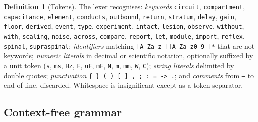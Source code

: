 \documentclass[11pt,twocolumn,a4paper]{article}
\theoremstyle{thmstyle}
\theoremstyle{definition}
\newtheorem{definition}[theorem]{Definition}
\theoremstyle{remark}
\begin{document}
\begin{definition}[Tokens]
\label{def:tokens}
The lexer recognises:
\emph{keywords}
\texttt{circuit}, \texttt{compartment}, \texttt{capacitance},
\texttt{element}, \texttt{conducts}, \texttt{outbound}, \texttt{return},
\texttt{stratum}, \texttt{delay}, \texttt{gain}, \texttt{floor},
\texttt{derived}, \texttt{event}, \texttt{type},
\texttt{experiment}, \texttt{intact}, \texttt{lesion}, \texttt{observe},
\texttt{without}, \texttt{with}, \texttt{scaling}, \texttt{noise},
\texttt{across}, \texttt{compare}, \texttt{report}, \texttt{let},
\texttt{module}, \texttt{import}, \texttt{reflex}, \texttt{spinal},
\texttt{supraspinal};
\emph{identifiers} matching \texttt{[A-Za-z\_][A-Za-z0-9\_]*} that are not
keywords;
\emph{numeric literals} in decimal or scientific notation, optionally
suffixed by a unit token (\texttt{s}, \texttt{ms}, \texttt{Hz},
\texttt{F}, \texttt{uF}, \texttt{mF}, \texttt{N}, \texttt{m}, \texttt{mm},
\texttt{W}, \texttt{C});
\emph{string literals} delimited by double quotes;
\emph{punctuation} \texttt{\{ \} ( ) [ ] , ; : = -> .};
and \emph{comments} from \texttt{--} to end of line, discarded.
Whitespace is insignificant except as a token separator.
\end{definition}

\subsection{Context-free grammar}
\end{document}
